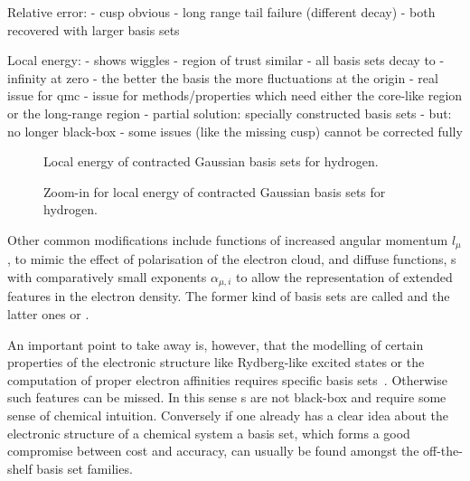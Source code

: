Relative error:
- cusp obvious
- long range tail failure (different decay)
- both recovered with larger basis sets

Local energy:
- shows wiggles
- region of trust similar
- all basis sets decay to -infinity at zero
- the better the basis the more fluctuations at the origin
- real issue for qmc
- issue for methods/properties which need either the core-like region
  or the long-range region
- partial solution: specially constructed basis sets
- but: no longer black-box
- some issues (like the missing cusp) cannot be corrected fully




\begin{figure}[p]
	\centering
	\caption{Local energy of contracted Gaussian basis sets for hydrogen.}
	\label{fig:LocalEnergyCgto}
\end{figure}

\begin{figure}[p]
	\centering
	\caption{Zoom-in for local energy of contracted Gaussian basis sets for hydrogen.}
	\label{fig:LocalEnergyCgtoZoom}
\end{figure}



Other common modifications include functions of increased angular momentum $l_\mu$,
to mimic the effect of polarisation of the electron cloud,
and diffuse functions,
\ie {\cGTO}s with comparatively small exponents $\alpha_{\mu,i}$
to allow the representation of extended features in the electron density.
The former kind of basis sets are called 
and the latter ones  or .



An important point to take away is, however,
that the modelling of certain properties of the electronic structure
like Rydberg-like excited states or the computation of proper electron affinities
requires specific basis sets~\cite{Hill2013,Jensen2013}.
Otherwise such features can be missed.
In this sense {\cGTO}s are not black-box and require some sense of chemical intuition.
Conversely if one already has a clear idea about the electronic structure
of a chemical system a basis set,
which forms a good compromise between cost and accuracy,
can usually be found amongst the off-the-shelf basis set families.


%
%



